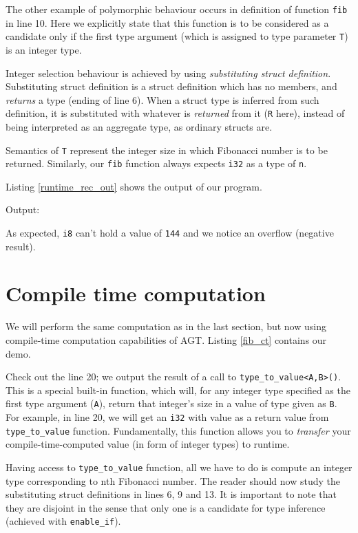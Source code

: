 \documentclass[times, utf8, diplomski]{fer}
\theoremstyle{definition}
\newcommand{\textcode}[3]{
    
}
\begin{document}
The other example of polymorphic behaviour occurs in definition of function \texttt{fib} in line 10.
Here we explicitly state that this function is to be considered as a candidate only if
the first type argument (which is assigned to type parameter \texttt{T}) is an integer type.

Integer selection behaviour is achieved by using \textit{substituting struct definition}.
Substituting struct definition is a struct definition which has no members,
and \textit{returns} a type (ending of line 6). When a struct type is inferred from such definition,
it is substituted with whatever is \textit{returned} from it (\texttt{R} here), 
instead of being interpreted as an aggregate type, as ordinary structs are.

Semantics of \texttt{T} represent the integer size in which Fibonacci number is to be returned.
Similarly, our \texttt{fib} function always expects \texttt{i32} as a type of \texttt{n}.

Listing \ref{runtime_rec_out} shows the output of our program.

Output:
\textcode{\resdir/programs/fib_runtime_recursion.out}{runtime_rec_out}{Fibonacci with recursion - output}

As expected, \texttt{i8} can't hold a value of \texttt{144} and we notice an overflow (negative result).


\section{Compile time computation}

We will perform the same computation as in the last section, but now using compile-time 
computation capabilities of AGT. Listing \ref{fib_ct} contains our demo.

\textcode{\resdir/programs/fib_compile_time.agt}{fib_ct}{Compile-time Fibonacci}

Check out the line 20; we output the result of a call to \texttt{type\_to\_value<A,B>()}.
This is a special built-in function, which will, for any integer type specified as the first 
type argument (\texttt{A}), return that integer's size in a value of type given as \texttt{B}.
For example, in line 20, we will get an \texttt{i32} with value  as a return value
from \texttt{type\_to\_value} function. Fundamentally, this function allows you to \textit{transfer}
your compile-time-computed value (in form of integer types) to runtime.

Having access to \texttt{type\_to\_value} function, all we have to do is compute an integer
type corresponding to nth Fibonacci number. The reader should now study the substituting
struct definitions in lines 6, 9 and 13. It is important to note that they are disjoint in the sense
that only one is a candidate for type inference (achieved with \texttt{enable\_if}).
\end{document}
